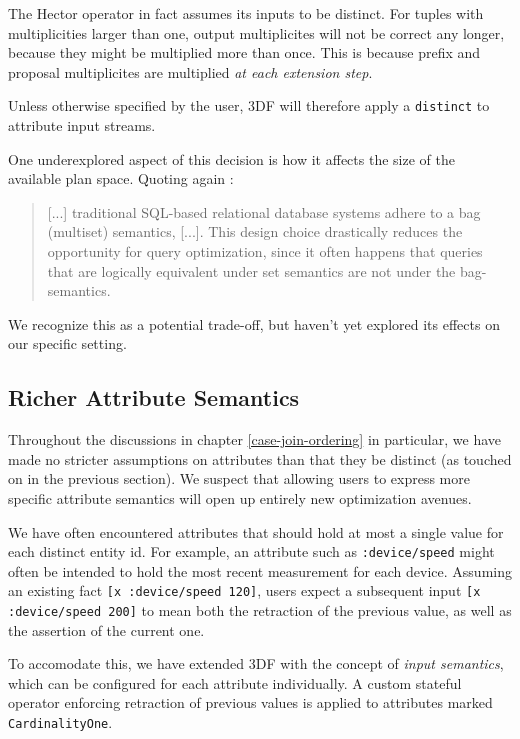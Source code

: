 \documentclass[../index.tex]{subfiles}
\begin{document}
The Hector operator in fact assumes its inputs to be distinct. For
tuples with multiplicities larger than one, output multiplicites will
not be correct any longer, because they might be multiplied more than
once. This is because prefix and proposal multiplicites are multiplied
\emph{at each extension step}.

Unless otherwise specified by the user, 3DF will therefore apply a
\texttt{distinct} to attribute input streams.

One underexplored aspect of this decision is how it affects the size
of the available plan space. Quoting again \cite{aref2015design}:

\begin{quote}
  [...] traditional SQL-based relational database systems adhere to a
  bag (multiset) semantics, [...]. This design choice drastically
  reduces the opportunity for query optimization, since it often
  happens that queries that are logically equivalent under set
  semantics are not under the bag-semantics.
\end{quote}

We recognize this as a potential trade-off, but haven't yet explored
its effects on our specific setting.

\subsection{Richer Attribute Semantics}

Throughout the discussions in chapter \ref{case-join-ordering} in
particular, we have made no stricter assumptions on attributes than
that they be distinct (as touched on in the previous section). We
suspect that allowing users to express more specific attribute
semantics will open up entirely new optimization avenues.

We have often encountered attributes that should hold at most a single
value for each distinct entity id. For example, an attribute such as
\texttt{:device/speed} might often be intended to hold the most recent
measurement for each device. Assuming an existing fact \texttt{[x
    :device/speed 120]}, users expect a subsequent input \texttt{[x
    :device/speed 200]} to mean both the retraction of the previous
value, as well as the assertion of the current one.

To accomodate this, we have extended 3DF with the concept of
\emph{input semantics}, which can be configured for each attribute
individually. A custom stateful operator enforcing retraction of
previous values is applied to attributes marked
\texttt{CardinalityOne}.
\end{document}
